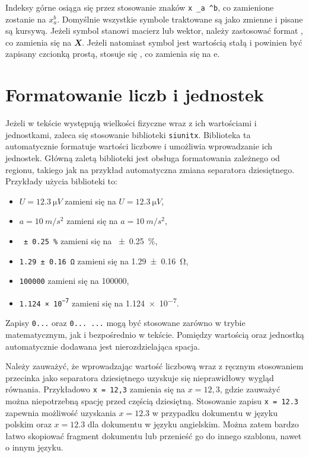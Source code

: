 Indeksy górne osiąga się przez stosowanie znaków \texttt{x _{a} ^{b}}, co zamienione zostanie na $x _{a} ^{b}$. Domyślnie wszystkie symbole traktowane są jako zmienne i pisane są kursywą. Jeżeli symbol stanowi macierz lub wektor, należy zastosować format \texttt{}, co zamienia się na $\mathbfit{X}$. Jeżeli natomiast symbol jest wartością stałą i powinien być zapisany czcionką prostą, stosuje się \texttt{}, co zamienia się na $\mathrm{e}$.

\section{Formatowanie liczb i jednostek}

Jeżeli w tekście występują wielkości fizyczne wraz z ich wartościami i jednostkami, zaleca się stosowanie biblioteki \texttt{siunitx}. Biblioteka ta automatycznie formatuje wartości liczbowe i umożliwia wprowadzanie ich jednostek. Główną zaletą biblioteki jest obsługa formatowania zależnego od regionu, takiego jak na przykład automatyczna zmiana separatora dziesiętnego. Przykłady użycia biblioteki to:
\begin{itemize}
\item \texttt{$U = \qty{12.3}{\micro V}$} zamieni się na $U = \qty{12.3}{\micro V}$,
\item \texttt{$a = \qty{10}{m \per s^2}$} zamieni się na $a = \qty{10}{m \per s^2}$,
\item \texttt{\qty{\pm 0.25}{\percent}} zamieni się na \qty{\pm 0.25}{\percent},
\item \texttt{\qty{1.29 \pm 0.16}{\ohm}} zamieni się na \qty{1.29 \pm 0.16}{\ohm},
\item \texttt{\num{100000}} zamieni się na \num{100000},
\item \texttt{\num{1.124e-7}} zamieni się na \num{1.124e-7}.
\end{itemize}
Zapisy \texttt{\num{...}} oraz \texttt{\qty{...}{...}} mogą być stosowane zarówno w trybie matematycznym, jak i bezpośrednio w tekście. Pomiędzy wartością oraz jednostką automatycznie dodawana jest nierozdzielająca spacja. 

Należy zauważyć, że wprowadzając wartość liczbową wraz z ręcznym stosowaniem przecinka jako separatora dziesiętnego uzyskuje się nieprawidłowy wygląd równania. Przykładowo \texttt{x = 12,3} zamienia się na $x = 12,3$, gdzie zauważyć można niepotrzebną spację przed częścią dziesiętną. Stosowanie zapisu \texttt{x = \num{12.3}} zapewnia możliwość uzyskania $x = \num[locale = PL]{12.3}$ w przypadku dokumentu w języku polskim oraz $x = \num[locale = US]{12.3}$ dla dokumentu w języku angielskim. Można zatem bardzo łatwo skopiować fragment dokumentu lub przenieść go do innego szablonu, nawet o innym języku.

